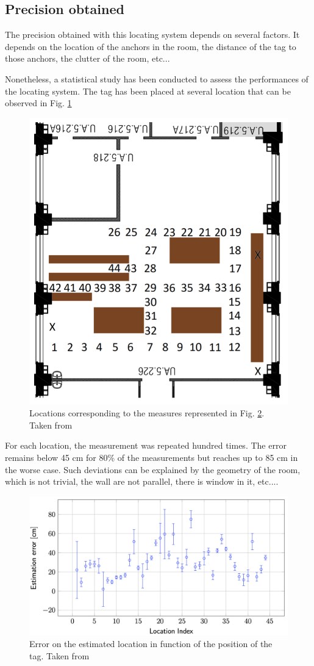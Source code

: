 \subsection{Precision obtained}

The precision obtained with this locating system depends on several factors. It depends on the location of the anchors in the room, the distance of the tag to those anchors, the clutter of the room, etc...
\vspace{2mm}

Nonetheless, a statistical study has been conducted to assess the performances of the locating system. The tag has been placed at several location that can be observed in Fig. \ref{fig:test_map}

\begin{figure}[H]
	\centering
	\includegraphics[width=.35\linewidth]{Images/test_map.png}
	\caption{Locations corresponding to the measures represented in Fig. \ref{fig:test_result}. Taken from \cite{hannotier2019indoor}}
	\label{fig:test_map}
\end{figure}

For each location, the measurement was repeated hundred times. The error remains below 45 cm for 80\% of the measurements but reaches up to 85 cm in the worse case. Such deviations can be explained by the geometry of the room, which is not trivial, the wall are not parallel, there is window in it, etc...\cite{hannotier2019indoor}.
\vspace{2mm}

\begin{figure}[H]
	\centering
	\includegraphics[width=.8\linewidth]{Images/test_fig.png}
	\caption{Error on the estimated location in function of the position of the tag. Taken from \cite{hannotier2019indoor}}
	\label{fig:test_result}
\end{figure}

